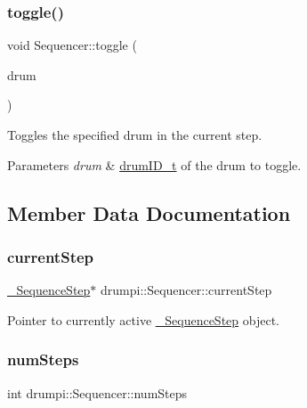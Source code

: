\subsubsection{\texorpdfstring{toggle()}{toggle()}\hspace{0.1cm}{\footnotesize\ttfamily [2/2]}}
{\footnotesize\ttfamily void Sequencer\+::toggle (\begin{DoxyParamCaption}\item[{\hyperlink{namespacedrumpi_a3897274035c1b939a604438abe648b1b}{drum\+I\+D\+\_\+t}}]{drum }\end{DoxyParamCaption})}

Toggles the specified drum in the current step. 
\begin{DoxyParams}{Parameters}
{\em drum} & \hyperlink{namespacedrumpi_a3897274035c1b939a604438abe648b1b}{drum\+I\+D\+\_\+t} of the drum to toggle. \\
\hline
\end{DoxyParams}


\subsection{Member Data Documentation}
\mbox{\label{classdrumpi_1_1Sequencer_a0bf12baf6bf923324df41f1ea784ba99}} 
\subsubsection{\texorpdfstring{current\+Step}{currentStep}}
{\footnotesize\ttfamily \hyperlink{classdrumpi_1_1__SequenceStep}{\+\_\+\+Sequence\+Step}$\ast$ drumpi\+::\+Sequencer\+::current\+Step\hspace{0.3cm}{\ttfamily [private]}}

Pointer to currently active \hyperlink{classdrumpi_1_1__SequenceStep}{\+\_\+\+Sequence\+Step} object. \mbox{\label{classdrumpi_1_1Sequencer_a0e4963cb16a4c6cbeb85838199c1bb8e}} 
\subsubsection{\texorpdfstring{num\+Steps}{numSteps}}
{\footnotesize\ttfamily int drumpi\+::\+Sequencer\+::num\+Steps\hspace{0.3cm}{\ttfamily [private]}}

